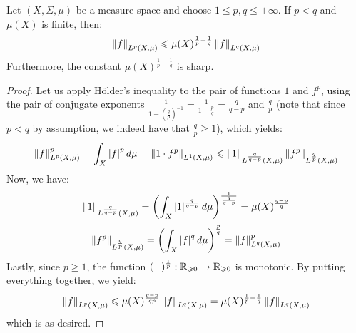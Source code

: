         \begin{lemma} \label{lemma: comparing_L_p_norms_for_finite_measures}
            Let $(X, \Sigma, \mu)$ be a measure space and choose $1 \leq p, q \leq +\infty$. If $p < q$ and $\mu(X)$ is finite, then:
                $$\left\| {f} \right\|_{L^p(X, \mu)} \leqslant \mu(X)^{\frac1p - \frac1q} \left\| {f} \right\|_{L^q(X, \mu)}$$
            Furthermore, the constant $\mu(X)^{\frac1p - \frac1q}$ is sharp.
        \end{lemma}
            \begin{proof}
                Let us apply H\"older's inequality to the pair of functions $1$ and $f^p$, using the pair of conjugate exponents $\frac{1}{1 - \left(\frac{q}{p}\right)^{-1}} = \frac{1}{1 - \frac{p}{q}} = \frac{q}{q - p}$ and $\frac{q}{p}$ (note that since $p < q$ by assumption, we indeed have that $\frac{q}{p} \geq 1$), which yields:
                    $$\left\| {f} \right\|_{L^p(X, \mu)}^p = \int_X \left\lvert {f} \right\rvert^p d\mu = \left\| { 1 \cdot f^p } \right\|_{L^1(X, \mu)} \leqslant \left\| {1} \right\|_{L^{\frac{q}{q - p}}(X, \mu)} \left\| {f^p} \right\|_{L^{\frac{q}{p}}(X, \mu)}$$
                Now, we have:
                    $$\left\| {1} \right\|_{L^{\frac{q}{q - p}}(X, \mu)} = \left(\int_X \left\lvert {1} \right\rvert^{\frac{q}{q - p}} d\mu\right)^{ \frac{1}{\frac{q}{q - p}} } = \mu(X)^{ \frac{q - p}{q} }$$
                    $$\left\| {f^p} \right\|_{L^{\frac{q}{p}}(X, \mu)} = \left( \int_X \left\lvert {f} \right\rvert^q d\mu \right)^{\frac{p}{q}} = \left\| {f} \right\|_{L^q(X, \mu)}^p$$
                Lastly, since $p \geq 1$, the function $(-)^{\frac1p}: \mathbb{R}_{\geqslant 0} \to \mathbb{R}_{\geqslant 0}$ is monotonic. By putting everything together, we yield:
                    $$\left\| {f} \right\|_{L^p(X, \mu)} \leqslant \mu(X)^{ \frac{q - p}{qp} } \left\| {f} \right\|_{L^q(X, \mu)} = \mu(X)^{\frac1p - \frac1q} \left\| {f} \right\|_{L^q(X, \mu)}$$
                which is as desired.
            \end{proof}
            
